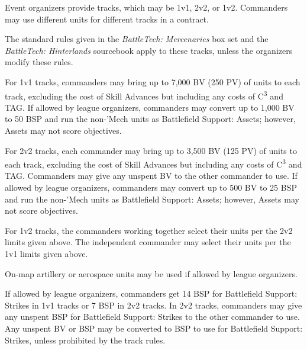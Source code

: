 Event organizers provide tracks, which may be 1v1, 2v2, or 1v2.
Commanders may use different units for different tracks in a contract.

The standard rules given in the \emph{BattleTech: Mercenaries} box set and the \emph{BattleTech: Hinterlands} sourcebook apply to these tracks, unless the organizers modify these rules.

For 1v1 tracks, commanders may bring up to 7,000 BV (250 PV) of units to each track, excluding the cost of Skill Advances but including any costs of C\textsuperscript{3} and TAG.
If allowed by league organizers, commanders may convert up to 1,000 BV to 50 BSP and run the non-'Mech units as Battlefield Support: Assets; however, Assets may not score objectives.

For 2v2 tracks, each commander may bring up to 3,500 BV (125 PV) of units to each track, excluding the cost of Skill Advances but including any costs of C\textsuperscript{3} and TAG.
Commanders may give any unspent BV to the other commander to use.
If allowed by league organizers, commanders may convert up to 500 BV to 25 BSP and run the non-'Mech units as Battlefield Support: Assets; however, Assets may not score objectives.

For 1v2 tracks, the commanders working together select their units per the 2v2 limits given above.
The independent commander may select their units per the 1v1 limits given above.

On-map artillery or aerospace units may be used if allowed by league organizers.

If allowed by league organizers, commanders get 14 BSP for Battlefield Support: Strikes in 1v1 tracks or 7 BSP in 2v2 tracks.
In 2v2 tracks, commanders may give any unspent BSP for Battlefield Support: Strikes to the other commander to use.
Any unspent BV or BSP may be converted to BSP to use for Battlefield Support: Strikes, unless prohibited by the track rules.
